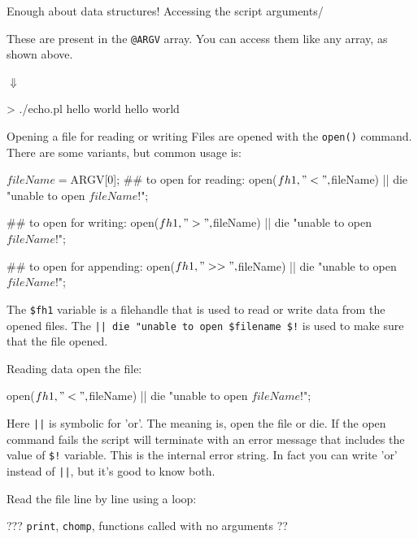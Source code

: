 \documentclass[pdf]{beamer}
\begin{document}
\begin{frame}[fragile]{Enough about data structures!}
  Accessing the script arguments/

  These are present in the \verb|@ARGV| array. You can access them like any
  array, as shown above.

  
  \hspace{1cm} $\Downarrow$

  \begin{consolecode}
  > ./echo.pl hello world
  hello
  world
  \end{consolecode}

\end{frame}

\begin{frame}[fragile]{Opening a file for reading or writing}
  Files are opened with the \texttt{open()} command. There are some variants,
  but common usage is:

  \begin{perlcode}
  $fileName = $ARGV[0];
  ## to open for reading:
  open($fh1, "<", $fileName) || 
       die "unable to open $fileName $!\n";
  
  ## to open for writing:
  open($fh1, ">", $fileName) || 
       die "unable to open $fileName $!\n";

  ## to open for appending:
  open($fh1, ">>", $fileName) || 
       die "unable to open $fileName $!\n";
  \end{perlcode}

  \small The \verb|$fh1| variable is a filehandle that is used to read or write data
  from the opened files. The \verb#|| die "unable to open $filename $!# is
  used to make sure that the file opened.

\end{frame}

\begin{frame}[fragile]{Reading data}
  open the file:
  \begin{perlcode}
  open($fh1, "<", $fileName) || 
       die "unable to open $fileName $!\n";
  \end{perlcode}

  \small Here \verb#||# is symbolic for 'or'. The meaning is, open the file or
  die. If the open command fails the script will terminate with an error
  message that includes the value of \verb|$!| variable. This is the internal
  error string. In fact you can write 'or' instead of \verb#||#, but it's good
  to know both.

  Read the file line by line using a loop:
  ??? \texttt{print}, \texttt{chomp}, functions called with no arguments ??
\end{frame}
\end{document}
